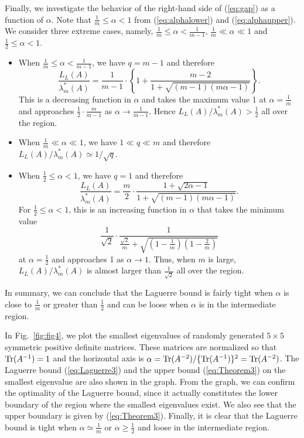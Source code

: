 \documentclass{amsart}
\begin{document}
Finally, we investigate the behavior of the right-hand side of (\ref{eq:gap}) as a function of $\alpha$. Note that $\frac{1}{m}\le \alpha <1$ from (\ref{eq:alphalower}) and (\ref{eq:alphaupper}). We consider three extreme cases, namely, $\frac{1}{m}\le\alpha<\frac{1}{m-1}$, $\frac{1}{m}\ll\alpha\ll 1$ and $\frac{1}{2}\le\alpha<1$.
\begin{itemize}
\item When $\frac{1}{m}\le\alpha<\frac{1}{m-1}$, we have $q=m-1$ and therefore
\begin{equation}
\frac{L_L(A)}{\lambda_m^*(A)} =\frac{1}{m-1}\cdot\left\{1+\frac{m-2}{1+\sqrt{(m-1)(m\alpha-1)}}\right\}.
\end{equation}
This is a decreasing function in $\alpha$ and takes the maximum value 1 at $\alpha=\frac{1}{m}$ and approaches $\frac{1}{2}\cdot\frac{m}{m-1}$ as $\alpha\rightarrow\frac{1}{m-1}$. Hence $L_L(A)/\lambda_m^*(A)>\frac{1}{2}$ all over the region.
\item When $\frac{1}{m}\ll\alpha\ll 1$, we have $1\ll q\ll m$ and therefore $L_L(A)/\lambda_m^*(A)\simeq 1/\sqrt{q}$.
\item When $\frac{1}{2}\le\alpha<1$, we have $q=1$ and therefore
\begin{equation}
\frac{L_L(A)}{\lambda_m^*(A)} = \frac{m}{2}\cdot\frac{1+\sqrt{2\alpha-1}}{1+\sqrt{(m-1)(m\alpha-1)}}.
\end{equation}
For $\frac{1}{2}\le\alpha<1$, this is an increasing function in $\alpha$ that takes the minimum value
\begin{equation}
\frac{1}{\sqrt{2}}\cdot\frac{1}{\frac{\sqrt{2}}{m}+\sqrt{\left(1-\frac{1}{m}\right)\left(1-\frac{2}{m}\right)}}
\end{equation}
at $\alpha=\frac{1}{2}$ and approaches 1 as $\alpha\rightarrow 1$. Thus, when $m$ is large, $L_L(A)/\lambda_m^*(A)$ is almost larger than $\frac{1}{\sqrt{2}}$ all over the region.
\end{itemize}

In summary, we can conclude that the Laguerre bound is fairly tight when $\alpha$ is close to $\frac{1}{m}$ or greater than $\frac{1}{2}$ and can be loose when $\alpha$ is in the intermediate region.

In Fig.~\ref{fig:fig4}, we plot the smallest eigenvalues of randomly generated $5\times 5$ symmetric positive definite matrices. These matrices are normalized so that ${\rm Tr}(A^{-1})=1$ and the horizontal axis is $\alpha={\rm Tr}(A^{-2})/\{{\rm Tr}(A^{-1})\}^2={\rm Tr}(A^{-2})$. The Laguerre bound (\ref{eq:Laguerre3}) and the upper bound (\ref{eq:Theorem3}) on the smallest eigenvalue are also shown in the graph. From the graph, we can confirm the optimality of the Laguerre bound, since it actually constitutes the lower boundary of the region where the smallest eigenvalues exist. We also see that the upper boundary is given by (\ref{eq:Theorem3}). Finally, it is clear that the Laguerre bound is tight when $\alpha\simeq\frac{1}{m}$ or $\alpha\ge\frac{1}{2}$ and loose in the intermediate region.
\end{document}
